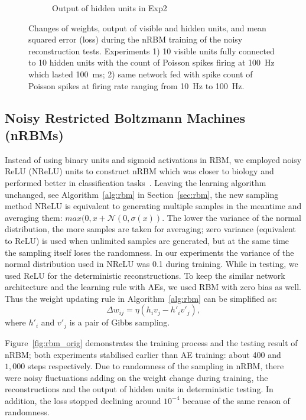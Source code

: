 \begin{figure}
\begin{subfigure}[t]{0.45\textwidth}
		\caption{Output of hidden units in Exp2}
	\end{subfigure}
	\caption{Changes of weights, output of visible and hidden units, and mean squared error (loss) during the nRBM training of the noisy reconstruction tests. 
		Experiments 1) 10 visible units fully connected to 10 hidden units with the count of Poisson spikes firing at 100~Hz which lasted 100~ms; 2) same network fed with spike count of Poisson spikes at firing rate ranging from 10~Hz to 100~Hz.}
	\label{fig:rbm_noise}
\end{figure}

\subsection{Noisy Restricted Boltzmann Machines (nRBMs)}
Instead of using binary units and sigmoid activations in RBM, we employed noisy ReLU (NReLU) units to construct nRBM which was closer to biology and performed better in classification tasks~\cite{nair2010rectified}.
Leaving the learning algorithm unchanged, see Algorithm~\ref{alg:rbm} in Section~\ref{sec:rbm}, the new sampling method NReLU is equivalent to generating multiple samples in the meantime and averaging them: $max(0, x+\mathcal{N}(0, \sigma(x))$.
The lower the variance of the normal distribution, the more samples are taken for averaging;
zero variance (equivalent to ReLU) is used when unlimited samples are generated, but at the same time the sampling itself loses the randomness.
In our experiments the variance of the normal distribution used in NReLU was 0.1 during training.
While in testing, we used ReLU for the deterministic reconstructions. 
To keep the similar network architecture and the learning rule with AEs, we used RBM with zero bias as well.
Thus the weight updating rule in Algorithm~\ref{alg:rbm} can be simplified as:
\begin{equation}
\Delta w_{ij} = \eta (h_iv_j - h'_iv'_j),
\label{equ:rbm}
\end{equation} 
where $h'_i$ and $v'_j$ is a pair of Gibbs sampling.

Figure~\ref{fig:rbm_orig} demonstrates the training process and the testing result of nRBM; both experiments stabilised earlier than AE training: about 400 and $1,000$ steps respectively.
Due to randomness of the sampling in nRBM, there were noisy fluctuations adding on the weight change during training, the reconstructions and the output of hidden units in deterministic testing.
In addition, the loss stopped declining around $10^{-4}$ because of the same reason of randomness.

